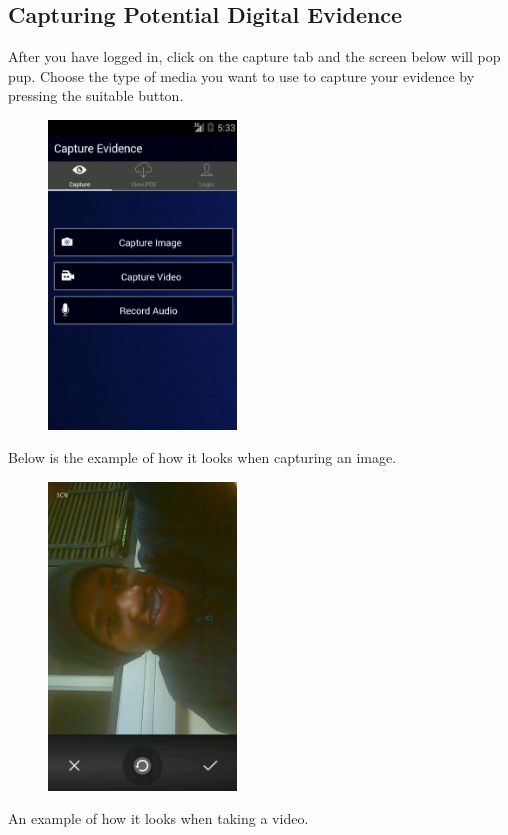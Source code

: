\documentclass[a4paper,12pt]{article}
\begin{document}
\subsection{Capturing Potential Digital Evidence}
After you have logged in, click on the capture tab and the screen below will pop pup. Choose the type of media you want to use to capture your evidence by pressing the suitable button.
\begin{figure}[H]
\begin{center}
\includegraphics[width=50mm,scale=0.5]{images/screenshots/home.png}
\end{center}
\end{figure} 
Below is the example of how it looks when capturing an image.
\begin{figure}[H]
\begin{center}
\includegraphics[width=50mm,scale=0.5]{images/screenshots/captureimage.png}
\end{center}
\end{figure}
An example of how it looks when taking a video.
\end{document}
